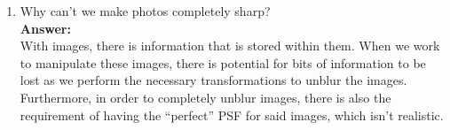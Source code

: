 \documentclass{article}
\begin{document}
\begin{enumerate}
{\begin{enumerate}
{        
        \begin{figure}
            \centering
            \begin{subfigure}[b]{0.5\textwidth}
                \texttt{[image: blurred\_photo.pdf]}
                \caption{The blurred image that is given by the raw data}
                \label{fig:gull}
            \end{subfigure}
            ~ %
            \begin{subfigure}[b]{0.5\textwidth}
                \texttt{[image: unblurred.pdf]}
                \caption{The ``unblurred'' image after performing the necessary Fourier transform to the $\Tilde{a_k}$ coefficients.}
                \label{fig:tiger}
            \end{subfigure}
            ~ %
        \end{figure}
        
        }
        \item{Why can't we make photos completely sharp?\\
        
        \textbf{Answer:}\\
        With images, there is information that is stored within them. When we work to manipulate these images, there is potential for bits of information to be lost as we perform the necessary transformations to unblur the images. Furthermore, in order to completely unblur images, there is also the requirement of having the ``perfect'' PSF for said images, which isn't realistic.}
    \end{enumerate}
    }
\end{enumerate}
\end{document}
